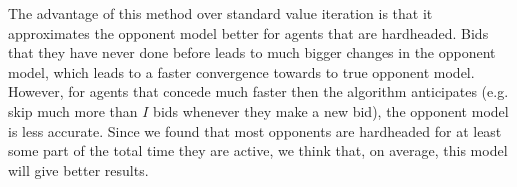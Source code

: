 The advantage of this method over standard value iteration is that it approximates the opponent model better for agents that are hardheaded. 
Bids that they have never done before leads to much bigger changes in the opponent model, which leads to a faster convergence towards to true opponent model. 
However, for agents that concede much faster then the algorithm anticipates (e.g. skip much more than $I$ bids whenever they make a new bid), the opponent model is less accurate. 
Since we found that most opponents are hardheaded for at least some part of the total time they are active, we think that, on average, this model will give better results.